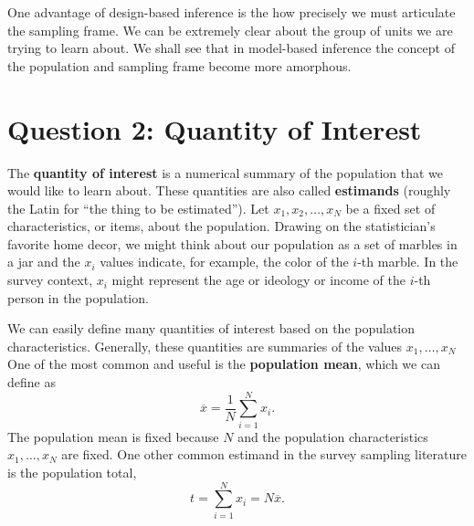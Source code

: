 \documentclass[
  letterpaper,
  DIV=11,
  numbers=noendperiod]{scrreprt}
\theoremstyle{definition}
\theoremstyle{plain}
\theoremstyle{definition}
\theoremstyle{remark}
\begin{document}
One advantage of design-based inference is the how precisely we must
articulate the sampling frame. We can be extremely clear about the group
of units we are trying to learn about. We shall see that in model-based
inference the concept of the population and sampling frame become more
amorphous.

\hypertarget{question-2-quantity-of-interest}{%
\section{Question 2: Quantity of
Interest}\label{question-2-quantity-of-interest}}

The \textbf{quantity of interest} is a numerical summary of the
population that we would like to learn about. These quantities are also
called \textbf{estimands} (roughly the Latin for ``the thing to be
estimated''). Let \(x_1, x_2, \ldots, x_N\) be a fixed set of
characteristics, or items, about the population. Drawing on the
statistician's favorite home decor, we might think about our population
as a set of marbles in a jar and the \(x_i\) values indicate, for
example, the color of the \(i\)-th marble. In the survey context,
\(x_i\) might represent the age or ideology or income of the \(i\)-th
person in the population.

We can easily define many quantities of interest based on the population
characteristics. Generally, these quantities are summaries of the values
\(x_1, \ldots, x_N\) One of the most common and useful is the
\textbf{population mean}, which we can define as \[
\overline{x} = \frac{1}{N} \sum_{i=1}^N x_i.
\] The population mean is fixed because \(N\) and the population
characteristics \(x_1, \ldots, x_N\) are fixed. One other common
estimand in the survey sampling literature is the population total, \[
t = \sum_{i=1}^N x_i = N\overline{x}.
\]
\end{document}
